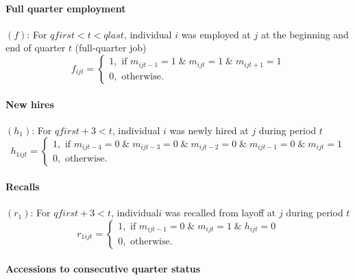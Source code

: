 \paragraph{Full quarter employment}

$\left( f\right) $: For $qfirst<t<qlast$, individual $i$ was employed at $j$
at the beginning and end of quarter $t$ (full-quarter job)%
\begin{equation}
f_{ijt}=\left\{ 
\begin{array}{l}
1,\text{ if }m_{ijt-1}=1\;\&\;m_{ijt}=1\;\&\;m_{ijt+1}=1 \\ 
0,\text{ otherwise.}%
\end{array}%
\right.  \label{eq:fijt}
\end{equation}

\paragraph{New hires}

$\left( h_{1}\right) $: For $qfirst+3<t$, individual $i$ was newly hired at $%
j$ during period $t$%
\begin{equation}
h_{1ijt}=\left\{ 
\begin{array}{l}
1,\text{ if }m_{ijt-4}=0\;\&\;m_{ijt-3}=0\;\&\;m_{ijt-2}=0\;\&\;m_{ijt-1}=0%
\;\&\;m_{ijt}=1 \\ 
0,\text{ otherwise.}%
\end{array}%
\right.  \label{eq:h1ijt}
\end{equation}

\paragraph{Recalls}

$\left( r_{1}\right) $: For $qfirst+3<t$, individual$i$ was recalled from
layoff at $j$ during period $t$%
\begin{equation}
r_{1ijt}=\left\{ 
\begin{array}{l}
1,\text{ if }m_{ijt-1}=0\;\&\;m_{ijt}=1\;\&\;h_{ijt}=0 \\ 
0,\text{ otherwise.}%
\end{array}%
\right.  \label{eq:r1ijt}
\end{equation}

\paragraph{Accessions to consecutive quarter status}

